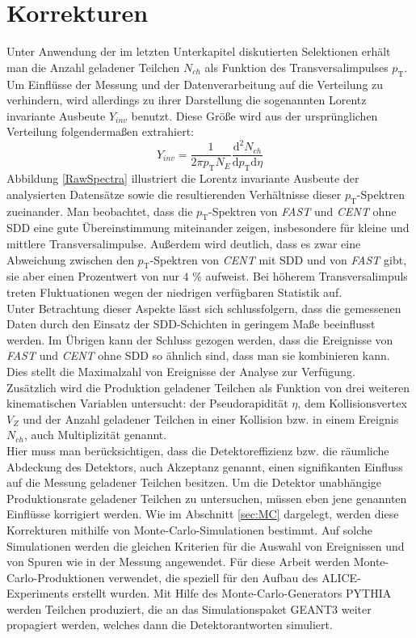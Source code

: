\documentclass[12pt,a4paper]{report}
\begin{document}
\section{Korrekturen}
\label{sec:Korr} 
Unter Anwendung der im letzten Unterkapitel diskutierten Selektionen erhält man die Anzahl geladener Teilchen $N_{ch}$ als Funktion des Transversalimpulses $p_{\mathrm{T}}$. Um Einflüsse der Messung und der Datenverarbeitung auf die Verteilung zu verhindern, wird allerdings zu ihrer Darstellung die sogenannten Lorentz invariante Ausbeute $Y_{inv}$ benutzt. Diese Größe wird aus der ursprünglichen Verteilung folgendermaßen extrahiert:
\begin{equation}
 Y_{inv} = \dfrac{1}{2\pi p_{\mathrm{T}} N_{E}} \dfrac{\mathrm{d}^2 N_{ch}}{\mathrm{d}p_{\mathrm{T}} \mathrm{d}\eta} 
\end{equation}
Abbildung \ref{RawSpectra} illustriert die Lorentz invariante Ausbeute der analysierten Datensätze sowie die resultierenden Verhältnisse dieser $p_{\mathrm{T}}$-Spektren zueinander. Man beobachtet, dass die $p_{\mathrm{T}}$-Spektren von \textit{FAST} und \textit{CENT} ohne SDD eine gute Übereinstimmung miteinander zeigen, insbesondere für kleine und mittlere Transversal\-impulse. Außerdem wird deutlich, dass es zwar eine Abweichung zwischen den $p_{\mathrm{T}}$-Spektren von \textit{CENT} mit SDD und von \textit{FAST} gibt, sie aber einen Prozentwert von nur $4$ \% aufweist. Bei höherem Transversalimpuls treten Fluktuationen wegen der niedrigen verfügbaren Statistik auf.\\
Unter Betrachtung dieser Aspekte lässt sich schlussfolgern, dass die gemessenen Daten durch den Einsatz der SDD-Schichten in geringem Maße beeinflusst werden. Im Übrigen kann der Schluss gezogen werden, dass die Ereignisse von \textit{FAST} und \textit{CENT} ohne SDD so ähnlich sind, dass man sie kombinieren kann. Dies stellt die Maximalzahl von Ereignisse der Analyse zur Verfügung. \\ 
Zusätzlich wird die Produktion geladener Teilchen als Funktion von drei weiteren kinematischen Variablen untersucht: der Pseudorapidität $\eta$, dem Kollisionsvertex $V_{Z}$ und der Anzahl geladener Teilchen in einer Kollision bzw. in einem Ereignis $N_{ch}$, auch Multiplizität genannt.\\
Hier muss man berücksichtigen, dass die Detektoreffizienz bzw. die räumliche Abdeckung des Detektors, auch Akzeptanz genannt, einen signifikanten Einfluss auf die Messung geladener Teilchen besitzen. Um die Detektor unabhängige Produktionsrate geladener Teilchen zu untersuchen, müssen eben jene genannten Einflüsse korrigiert werden. Wie im Abschnitt \ref{sec:MC} dargelegt, werden diese Korrekturen mithilfe von Monte-Carlo-Simulationen bestimmt. Auf solche Simulationen werden die gleichen Kriterien für die Auswahl von Ereignissen und von Spuren wie in der Messung angewendet. Für diese Arbeit werden Monte-Carlo-Produktionen verwendet, die speziell für den Aufbau des ALICE-Experiments erstellt wurden. Mit Hilfe des Monte-Carlo-Generators PYTHIA werden Teilchen produziert, die an das Simulationspaket GEANT3 weiter propagiert werden, welches dann die Detektorantworten simuliert.\\
\end{document}
